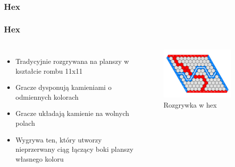 \documentclass[polish,envcountsect,10pt]{beamer}
\begin{document}
            \subsubsection{Hex}
                \begin{frame}
                    \frametitle{Hex}
                    \begin{columns}
                            \begin{itemize}
                                \item<1-> Tradycyjnie rozgrywana na planszy w kształcie rombu 11x11
                                \item<2-> Gracze dysponują kamieniami o odmiennych kolorach
                                \item<3-> Gracze układają kamienie na wolnych polach
                                \item<4-> Wygrywa ten, który utworzy nieprzerwany ciąg łączący boki planszy własnego koloru
                            \end{itemize}
                        \begin{figure}[H]
                            \centering
                            \includegraphics[width=\textwidth]{images/hex}
                            \caption{Rozgrywka w hex}
                        \end{figure}
                    \end{columns}                    
                \end{frame}
\end{document}
